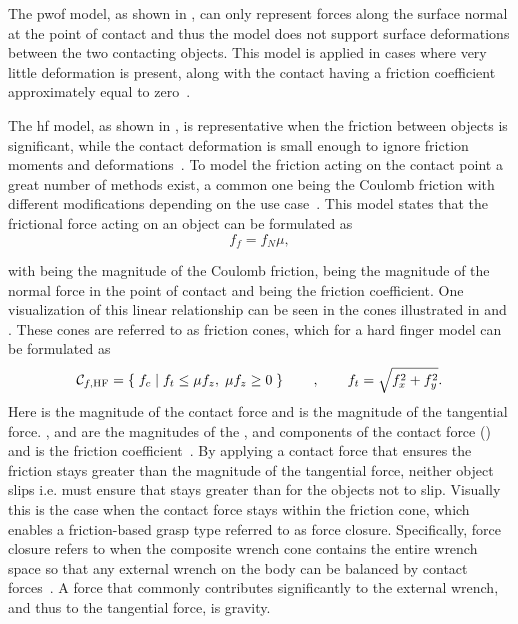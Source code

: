 The \gls{pwof} model, as shown in , can only represent forces along the surface normal  at the point of contact  and thus the model does not support surface deformations between the two contacting objects. This model is applied in cases where very little deformation is present, along with the contact having a friction coefficient approximately equal to zero~\cite[Chapter 38]{handbook-of-robotics}.\medskip


The \gls{hf} model, as shown in , is representative when the friction between objects is significant, while the contact deformation is small enough to ignore friction moments and deformations~\cite[Chapter 38]{handbook-of-robotics}. To model the friction acting on the contact point a great number of methods exist, a common one being the Coulomb friction with different modifications depending on the use case~\cite{modelling-of-joint-friction-in-robotic-manipulators-with-gear-transmissions}. 
This model states that the frictional force acting on an object can be formulated as
%
\begin{equation}
	f_f = f_N \mu,
	\label{eq:coulomb-friction}
\end{equation}

with  being the magnitude of the Coulomb friction,  being the magnitude of the normal force in the point of contact and \mvar{\mu\in[0,1]} being the friction coefficient. One visualization of this linear relationship can be seen in the cones illustrated in  and . These cones are referred to as friction cones, which for a hard finger model can be formulated as
%
\begin{equation} 
	\mathcal{C}_{f,\text{HF}} = \left\{ \; f_c\; \middle|\; f_{t} \le \mu f_z,\; \mu f_z \ge 0 \; \right\} \qquad , \qquad f_t = \sqrt{f_x^2 + f_y^2}.
	\label{eq:hf}
\end{equation}
%
Here  is the magnitude of the contact force and  is the magnitude of the tangential force. ,  and  are the magnitudes of the ,  and  components of the contact force () and \mvar{\mu} is the friction coefficient~\cite[Chapter 37]{handbook-of-robotics}. By applying a contact force that ensures the friction stays greater than the magnitude of the tangential force, neither object slips i.e.  must ensure that  stays greater than  for the objects not to slip. Visually this is the case when the contact force  stays within the friction cone, which enables a friction-based grasp type referred to as force closure. Specifically, force closure refers to when the composite wrench cone contains the entire wrench space so that any external wrench  on the body can be balanced by contact forces~\cite{modern-robotics-mechanics-planning-and-control}. A force that commonly contributes significantly to the external wrench, and thus to the tangential force, is gravity. \medskip

